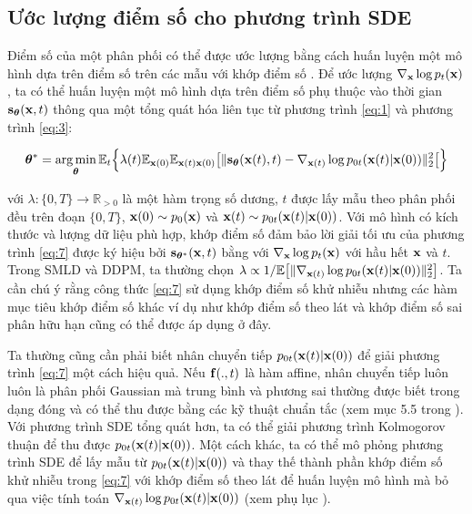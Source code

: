 \documentclass{article} %
\begin{document}
\subsection{Ước lượng điểm số cho phương trình SDE} \label{Estimating-Scores-For-The-SDE}

Điểm số của một phân phối có thể được ước lượng bằng cách huấn luyện một mô hình dựa trên điểm số trên các mẫu với khớp điểm số \citep{hyvarinen2005estimation,song2020sliced}. Để ước lượng $\nabla_{\bold{x}} \log p_t(\bold{x})$, ta có thể huấn luyện một mô hình dựa trên điểm số phụ thuộc vào thời gian $\bold{s}_{\boldsymbol{\theta}}(\bold{x}, t)$ thông qua một tổng quát hóa liên tục từ phương trình \ref{eq:1} và phương trình \ref{eq:3}:

\begin{equation} \label{eq:7}
    \boldsymbol{\theta}^{\ast} = \operatorname*{arg\,min}_{\boldsymbol{\theta}} \mathbb{E}_t \Big \lbrace  \lambda(t) \mathbb{E}_{\bold{x}(0)} \mathbb{E}_{\bold{x}(t) \bold{x}(0)} \big \lbrack \lVert \bold{s}_{\boldsymbol{\theta}} (\bold{x}(t), t) - \nabla_{\bold{x}(t)} \log p_{0t} (\bold{x}(t) \vert \bold{x}(0)) \rVert_2^2 \big \lbrack \Big \rbrace
\end{equation}

với $\lambda: \lbrace 0, T \rbrace \rightarrow \mathbb{R}_{>0}$ là một hàm trọng số dương,
$t$ được lấy mẫu theo phân phối đều trên đoạn $\lbrace 0, T \rbrace$, $\bold{x}(0) \sim p_0 (\bold{x})$ và $\bold{x}(t) \sim p_{0t} (\bold{x}(t) \vert \bold{x}(0))$.
Với mô hình có kích thước và lượng dữ liệu phù hợp, khớp điểm số đảm bảo lời giải tối ưu của phương trình \ref{eq:7} được ký hiệu bởi $\bold{s}_{\boldsymbol{\theta}^{\ast}}(\bold{x}, t)$ bằng với $\nabla_{\bold{x}} \log p_t (\bold{x})$ với hầu hết $\bold{x}$ và $t$.
Trong SMLD và DDPM, ta thường chọn $\lambda \propto 1 / \mathbb{E} \big \lbrack \lVert \nabla_{\bold{x}(t)} \log p_{0t} (\bold{x}(t) \vert \bold{x}(0)) \rVert_2^2 \big \rbrack$.
Ta cần chú ý rằng công thức \ref{eq:7} sử dụng khớp điểm số khử nhiễu nhưng các hàm mục tiêu khớp điểm số khác ví dụ như khớp điểm số theo lát \citep{song2020sliced} và khớp điểm số sai phân hữu hạn \citep{pang2020efficient} cũng có thể được áp dụng ở đây.

Ta thường cũng cần phải biết nhân chuyển tiếp $p_{0t} (\bold{x}(t) \vert \bold{x}(0))$ để giải phương trình \ref{eq:7} một cách hiệu quả.
Nếu $\bold{f}(.,t)$ là hàm affine, nhân chuyển tiếp luôn luôn là phân phối Gaussian mà trung bình và phương sai thường được biết trong dạng đóng và có thể thu được bằng các kỹ thuật chuẩn tắc (xem mục 5.5  trong \cite{sarkka2019applied}).
Với phương trình SDE tổng quát hơn, ta có thể giải phương trình Kolmogorov thuận \citep{oksendal2003stochastic} để thu được $p_{0t} (\bold{x}(t) \vert \bold{x}(0))$.
Một cách khác, ta có thể mô phỏng phương trình SDE để lấy mẫu từ $p_{0t}(\bold{x}(t) \vert \bold{x}(0))$ và thay thế thành phần khớp điểm số khử nhiễu trong \ref{eq:7} với khớp điểm số theo lát để huấn luyện mô hình mà bỏ qua việc tính toán $\nabla_{\bold{x}(t)} \log p_{0t} (\bold{x}(t) \vert \bold{x}(0))$ (xem phụ lục ).
\end{document}
